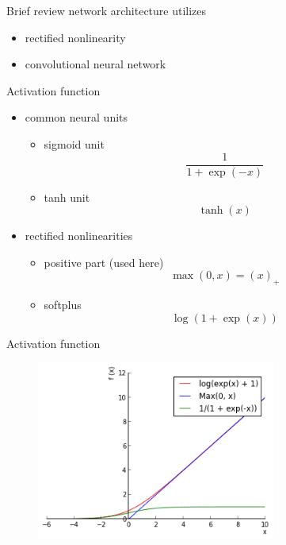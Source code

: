 \begin{frame}{Brief review}
    network architecture utilizes
    \vspace*{0.5em}
    \begin{itemize}\itemsep=12pt

        \item rectified nonlinearity

        \item convolutional neural network

    \end{itemize}
\end{frame}

\begin{frame}{Activation function}
    \begin{itemize}\itemsep=12pt

        \item common neural units
        \vspace*{0.5em}
        \begin{itemize}
            \item sigmoid unit 
            \[
                \frac{1}{1 + \exp\left(-x\right)}
            \]
            \item tanh unit 
            \[
                \tanh\left(x\right)
            \]
        \end{itemize}

        \item rectified nonlinearities
        \vspace*{0.5em}
        \begin{itemize}
            \item positive part (used here)
            \[
                \max\left(0,x\right) = \left(x\right)_{+}
            \]
            \item softplus
            \[
                \log\left(1 + \exp\left(x\right)\right)
            \]
        \end{itemize}

    \end{itemize}
\end{frame}

\begin{frame}{Activation function}
    \begin{figure}
        \centering
        \includegraphics[width=0.7\textwidth]{neurons.png}
    \end{figure}
\end{frame}

